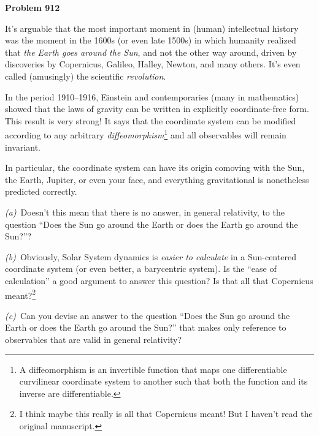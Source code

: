 \documentclass[12pt]{article}
\begin{document}
\begin{pottproblem}
\textbf{Problem 912}

It's arguable that the most important moment in (human) intellectual
history was the moment in the 1600s (or even late 1500s) in which
humanity realized that \emph{the Earth goes around the Sun}, and not
the other way around, driven by discoveries by Copernicus, Galileo,
Halley, Newton, and many others.  It's even called (amusingly) the
scientific \emph{revolution}.

In the period 1910--1916, Einstein and contemporaries (many in
mathematics) showed that the laws of gravity can be written in
explicitly coordinate-free form. This result is very strong! It says
that the coordinate system can be modified according to any arbitrary
\emph{diffeomorphism}\footnote{A diffeomorphism is an invertible
function that maps one differentiable curvilinear coordinate system to
another such that both the function and its inverse are
differentiable.} and all observables will remain invariant.

In particular, the coordinate system can have its origin comoving with
the Sun, the Earth, Jupiter, or even your face, and everything
gravitational is nonetheless predicted correctly.


\textsl{(a)}~Doesn't this mean that there is no answer, in general
relativity, to the question ``Does the Sun go around the Earth or does
the Earth go around the Sun?''?

\textsl{(b)}~Obviously, Solar System dynamics is \emph{easier to
calculate} in a Sun-centered coordinate system (or even better, a
barycentric system). Is the ``ease of calculation'' a good argument to
answer this question? Is that all that Copernicus meant?\footnote{I
think maybe this really is all that Copernicus meant! But I haven't
read the original manuscript.}

\textsl{(c)}~Can you devise an answer to the question ``Does the Sun
go around the Earth or does the Earth go around the Sun?'' that makes
only reference to observables that are valid in general relativity?

\end{pottproblem}
\end{document}
